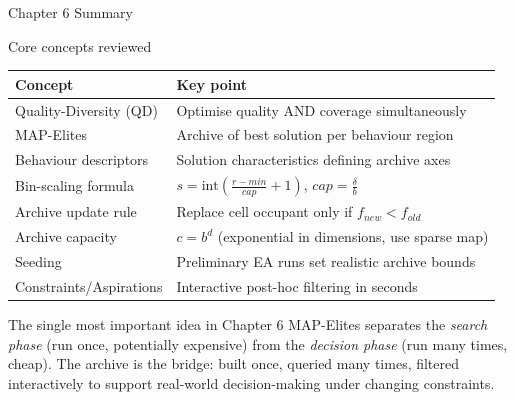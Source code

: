 \documentclass[aspectratio=169,10pt]{beamer}
\begin{document}
\begin{frame}{Chapter 6 Summary}

\begin{block}{Core concepts reviewed}
\begin{tabular}{ll}
\toprule
\textbf{Concept} & \textbf{Key point} \\
\midrule
Quality-Diversity (QD) & Optimise quality AND coverage simultaneously \\
MAP-Elites & Archive of best solution per behaviour region \\
Behaviour descriptors & Solution characteristics defining archive axes \\
Bin-scaling formula & $s = \mathrm{int}\!\left(\frac{r-min}{cap}+1\right)$, $cap = \frac{\delta}{b}$ \\
Archive update rule & Replace cell occupant only if $f_{new} < f_{old}$ \\
Archive capacity & $c = b^d$ (exponential in dimensions, use sparse map) \\
Seeding & Preliminary EA runs set realistic archive bounds \\
Constraints/Aspirations & Interactive post-hoc filtering in seconds \\
\bottomrule
\end{tabular}
\end{block}

\medskip
\begin{alertblock}{The single most important idea in Chapter 6}
MAP-Elites separates the \emph{search phase} (run once, potentially
expensive) from the \emph{decision phase} (run many times, cheap).
The archive is the bridge: built once, queried many times, filtered
interactively to support real-world decision-making under changing
constraints.
\end{alertblock}

\end{frame}
\end{document}
